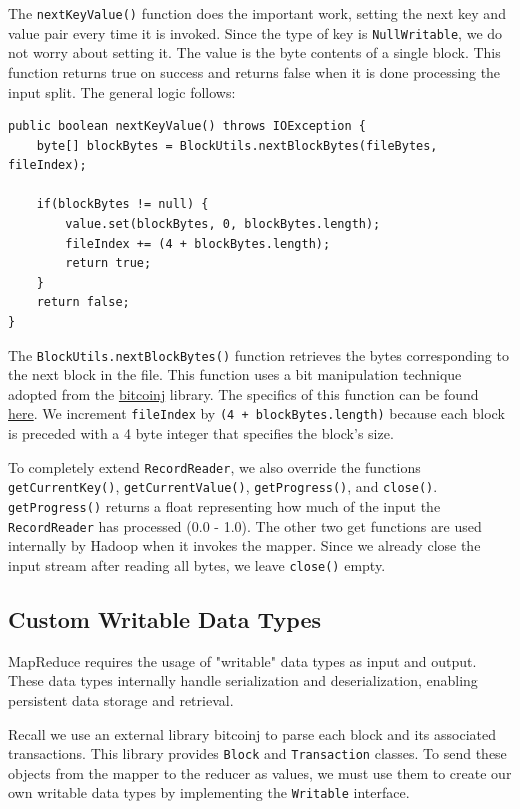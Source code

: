 \documentclass[9pt,twocolumn,twoside]{idsi}
\begin{document}
The \lstinline{nextKeyValue()} function does the important work, setting the next key and value pair every time it is invoked. Since the type of key is \lstinline{NullWritable}, we do not worry about setting it. The value is the byte contents of a single block. This function returns true on success and returns false when it is done processing the input split. The general logic follows:

\begin{lstlisting}
public boolean nextKeyValue() throws IOException {
    byte[] blockBytes = BlockUtils.nextBlockBytes(fileBytes, fileIndex);

    if(blockBytes != null) {
        value.set(blockBytes, 0, blockBytes.length);
        fileIndex += (4 + blockBytes.length);
        return true;
    }
    return false;
}
\end{lstlisting}

The \lstinline{BlockUtils.nextBlockBytes()} function retrieves the bytes corresponding to the next block in the file. This function uses a bit manipulation technique adopted from the \href{https://bitcoinj.github.io/}{bitcoinj} library. The specifics of this function can be found \href{https://github.com/nishilshah17/idsi_bitcoin/blob/97859e4f8284f2fc5c1db488d61d075af9ea256d/reduce_blockchain/blockparser/BlockUtils.java#L30}{here}. We increment \lstinline{fileIndex} by \lstinline{(4 + blockBytes.length)} because each block is preceded with a 4 byte integer that specifies the block's size.

To completely extend \lstinline{RecordReader}, we also override the functions \lstinline{getCurrentKey()}, \lstinline{getCurrentValue()}, \lstinline{getProgress()}, and \lstinline{close()}. \lstinline{getProgress()} returns a float representing how much of the input the \lstinline{RecordReader} has processed (0.0 - 1.0). The other two get functions are used internally by Hadoop when it invokes the mapper. Since we already close the input stream after reading all bytes, we leave \lstinline{close()} empty.

\subsection{Custom Writable Data Types}

MapReduce requires the usage of "writable" data types as input and output. These data types internally handle serialization and deserialization, enabling persistent data storage and retrieval.

Recall we use an external library bitcoinj to parse each block and its associated transactions. This library provides \lstinline{Block} and \lstinline{Transaction} classes. To send these objects from the mapper to the reducer as values, we must use them to create our own writable data types by implementing the \lstinline{Writable} interface.
\end{document}
